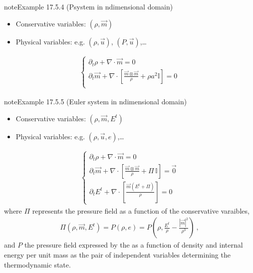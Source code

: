 \documentclass[letterpaper,10pt,english]{jupyterBook}
\begin{document}
\label{ch/pde/hyperbolic:example-7}
\begin{sphinxadmonition}{note}{Example 17.5.4 (P\sphinxhyphen{}system in n\sphinxhyphen{}dimensional domain)}


\begin{itemize}
\item {} 
\sphinxAtStartPar
Conservative variables: \((\rho, \vec{m})\)

\item {} 
\sphinxAtStartPar
Physical variables: e.g. \((\rho, \vec{u})\), \((P, \vec{u})\),…

\end{itemize}
\begin{equation*}
\begin{split}\begin{cases}
  \partial_t \rho + \nabla \cdot \vec{m} = 0 \\
  \partial_t \vec{m} + \nabla \cdot \left[ \frac{\vec{m}\otimes\vec{m}}{\rho} + \rho a^2 \mathbb{I} \right] = 0 \\
\end{cases}\end{split}
\end{equation*}\end{sphinxadmonition}
\label{ch/pde/hyperbolic:example-8}
\begin{sphinxadmonition}{note}{Example 17.5.5 (Euler system in n\sphinxhyphen{}dimensional domain)}


\begin{itemize}
\item {} 
\sphinxAtStartPar
Conservative variables: \((\rho, \vec{m}, E^t)\)

\item {} 
\sphinxAtStartPar
Physical variables: e.g. \((\rho, \vec{u}, e)\),…

\end{itemize}
\begin{equation*}
\begin{split}\begin{cases}
  \partial_t \rho + \nabla \cdot \vec{m} = 0 \\
  \partial_t \vec{m} + \nabla \cdot \left[ \frac{\vec{m}\otimes\vec{m}}{\rho} + \Pi \, \mathbb{I} \right] = \vec{0} \\
  \partial_t E^t + \nabla \cdot \left[ \frac{\vec{m} (E^t + \Pi)}{\rho} \right] = 0
\end{cases}\end{split}
\end{equation*}
\sphinxAtStartPar
where \(\Pi\) represents the pressure field as a function of the conservative varaibles,
\begin{equation*}
\begin{split}\Pi\left(\rho, \vec{m}, E^t\right) = P\left( \rho, e\right) = P\left( \rho, \frac{E^t}{\rho}-\frac{|\vec{m}|^2}{\rho^3}  \right) \ ,\end{split}
\end{equation*}
\sphinxAtStartPar
and \(P\) the pressure field expressed by the  as a function of density and internal energy per unit mass as the pair of independent variables determining the thermodynamic state.
\end{sphinxadmonition}
\end{document}
